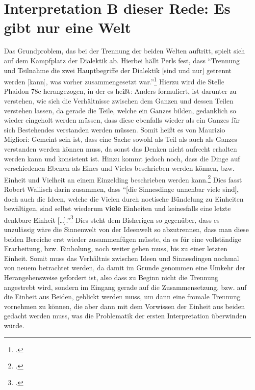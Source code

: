 \section{Interpretation B dieser Rede: Es gibt nur eine Welt}
Das Grundproblem, das bei der Trennung der beiden Welten auftritt, spielt sich auf dem Kampfplatz der Dialektik ab. Hierbei hällt Perls fest, dass \enquote{Trennung und Teilnahme die zwei Hauptbegriffe der Dialektik [sind und nur] getrennt werden [kann], was vorher zusammengesetzt war.}\footcite[vgl.][S. 349]{Perls}
Hierzu wird die Stelle Phaidon 78c herangezogen, in der es heißt:
Anders formuliert, ist darunter zu verstehen, wie sich die Verhältnisse zwischen dem Ganzen und dessen Teilen verstehen lassen, da gerade die Teile, welche ein Ganzes bilden, gedanklich so wieder eingeholt werden müssen, dass diese ebenfalls wieder als ein Ganzes für sich Bestehendes verstanden werden müssen. Somit heißt es von Maurizio Migliori:
Gemeint sein ist, dass eine Sache sowohl als Teil als auch als Ganzes verstanden werden können muss, da sonst das Denken nicht aufrecht erhalten werden kann und konsistent ist.
Hinzu kommt jedoch noch, dass die Dinge auf verschiedenen Ebenen als Eines und Vieles beschrieben werden können, bzw. Einheit und Vielheit an einem Einzelding beschrieben werden kann.\footcite[vgl.][S. 112]{Migliori} Dies fasst Robert Wallisch darin zusammen, dass \enquote{[die Sinnesdinge unnenbar viele sind], doch auch die Ideen, welche die Vielen durch noetische Bündelung zu Einheiten bewältigen, sind selbst wiederum \textbf{viele} Einheiten und keinesfalls eine letzte denkbare Einheit [\dots].}\footcite[vgl.][S. 12]{Wallisch}
Dies steht dem Bisherigen so gegenüber, dass es unzulässig wäre die Sinnenwelt von der Ideenwelt so abzutrennen, dass man diese beiden Bereiche erst wieder zusammenfügen müsste, da es für eine vollständige Erarbeitung, bzw. Einholung, noch weiter gehen muss, bis zu einer letzten Einheit.
Somit muss das Verhältnis zwischen Ideen und Sinnesdingen nochmal von neuem betrachtet werden, da damit im Grunde genommen eine Umkehr der Herangehensweise gefordert ist, also dass zu Beginn nicht die Trennung angestrebt wird, sondern im Eingang gerade auf die Zusammensetzung, bzw. auf die Einheit aus Beiden, geblickt werden muss, um dann eine fromale Trennung vornehmen zu können, die aber dann mit dem Vorwissen der Einheit aus beiden gedacht werden muss, was die Problematik der ersten Interpretation überwinden würde.
